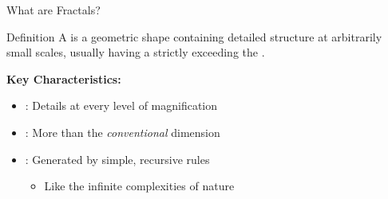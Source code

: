 \begin{frame}{What are Fractals?}
  \begin{conceptbox}{Definition}
    A  is a geometric shape containing detailed
    structure at arbitrarily small scales, usually having a
     strictly exceeding the
    .
  \end{conceptbox}

  \vspace{0.1cm}

  \textbf{Key Characteristics:}
  \begin{itemize}
    \item {}: Details at every level of magnification
    \item {}: More than the \textit{conventional} dimension
    \item {}: Generated by simple, recursive rules
      \begin{itemize}
        \item Like the infinite complexities of nature
      \end{itemize}
  \end{itemize}

  \vspace{0.1cm}

  \pause
  \begin{center}
  \end{center}
\end{frame}

